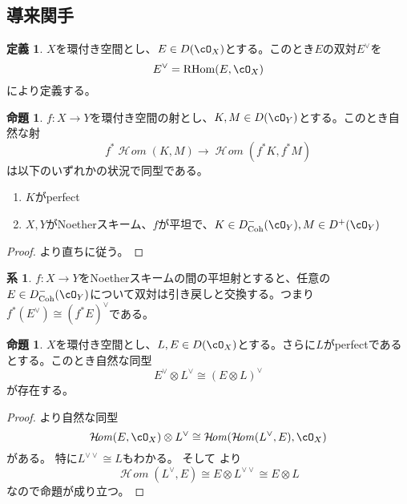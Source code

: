 \documentclass[uplatex, a4paper, dvipdfmx]{jsarticle}
\theoremstyle{definition}
\newtheorem{definition}[theorem]{定義}
\newtheorem{proposition}[theorem]{命題}
\newtheorem{corollary}[theorem]{系}
\DeclareMathOperator{\CHom}{\mathcal{H}\!\mathit{om}}
\DeclareMathOperator{\RHom}{\mathrm{RHom}}
\DeclareMathOperator{\Coh}{\mathrm{Coh}}
\begin{document}
\subsection{導来関手}
\begin{definition}
    $X$を環付き空間とし、$E \in D(\cO_X)$とする。このとき$E$の双対$E^\vee$を
    \begin{equation}
        E^\vee = \RHom(E, \cO_X)
    \end{equation}
    により定義する。
\end{definition}
\begin{proposition}
    $f \colon X \to Y$を環付き空間の射とし、$K, M \in D(\cO_Y)$とする。このとき自然な射
    \begin{equation}
        f^*\CHom(K, M) \to \CHom(f^*K, f^*M)
    \end{equation}
    は以下のいずれかの状況で同型である。
    \begin{enumerate}
        \item $K$がperfect
        \item $X, Y$がNoetherスキーム、$f$が平坦で、$K \in D_{\Coh}^-(\cO_Y), M \in D^+(\cO_Y)$
    \end{enumerate}
\end{proposition}
\begin{proof}
    {\cite[\href{https://stacks.math.columbia.edu/tag/0GM7}{Tag 0GM7}]{stacks-project}}より直ちに従う。
\end{proof}
\begin{corollary}\label{cor:pullback-and-dual}
    $f \colon X \to Y$をNoetherスキームの間の平坦射とすると、任意の$E \in D_{\Coh}^-(\cO_Y)$について双対は引き戻しと交換する。つまり$f^*(E^\vee) \cong (f^*E)^\vee$である。
\end{corollary}
\begin{proposition}\label{prop:tensor-and-dual}
    $X$を環付き空間とし、$L, E \in D(\cO_X)$とする。さらに$L$がperfectであるとする。このとき自然な同型
    \begin{equation}
        E^\vee \otimes L^\vee \cong (E \otimes L)^\vee
    \end{equation}
    が存在する。
\end{proposition}
\begin{proof}
    {\cite[\href{https://stacks.math.columbia.edu/tag/0G40}{Tag 0G40}]{stacks-project}}より自然な同型
    \begin{equation}
        \CHom(E, \cO_X) \otimes L^\vee \cong \CHom(\CHom(L^\vee, E), \cO_X)
    \end{equation}
    がある。
    特に$L^{\vee\vee} \cong L$もわかる。
    そして {\cite[\href{https://stacks.math.columbia.edu/tag/08DQ}{Tag 08DQ}]{stacks-project}}より
    \begin{equation}
        \CHom(L^\vee, E) \cong E \otimes L^{\vee\vee} \cong E \otimes L
    \end{equation}
    なので命題が成り立つ。
\end{proof}
\end{document}
